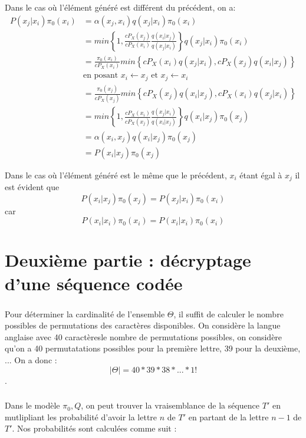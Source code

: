 \documentclass[11pt]{report}
\begin{document}
Dans le cas où l'élément généré est différent du précédent, on a:
\begin{align*}
P(x_j | x_i) \pi_0(x_i)
&= \alpha(x_j, x_i) q(x_j| x_i) \pi_0(x_i) \\
&= min \left\{1, \frac{cP_X(x_j)}{cP_X(x_i)} \frac{q(x_i|x_j)}{q(x_j|x_i)}\right\} q(x_j| x_i) \pi_0(x_i) \\
&= \frac{\pi_0(x_i)}{cP_X(x_i)} min \left\{cP_X(x_i) q(x_j|x_i), cP_X(x_j) q(x_i|x_j)\right\} \\
&\text{en posant } x_i \leftarrow x_j \text{ et } x_j \leftarrow x_i \\
&= \frac{\pi_0(x_j)}{cP_X(x_j)} min \left\{cP_X(x_j) q(x_i|x_j), cP_X(x_i) q(x_j|x_i)\right\} \\
&= min \left\{1, \frac{cP_X(x_i)}{cP_X(x_j)} \frac{q(x_j|x_i)}{q(x_i|x_j)}\right\} q(x_i| x_j) \pi_0(x_j)\\
&= \alpha(x_i, x_j) q(x_i| x_j) \pi_0(x_j) \\
&= P(x_i | x_j) \pi_0(x_j)
\end{align*} 

Dans le cas où l'élément généré est le même que le précédent, $x_i$ étant égal à $x_j$ il est évident que 
$$P(x_i | x_j) \pi_0(x_j) = P(x_j | x_i) \pi_0(x_i)$$
car 
$$P(x_i | x_i) \pi_0(x_i) = P(x_i | x_i) \pi_0(x_i)$$
\section{Deuxième partie : décryptage d’une séquence codée}
\subsubsection{}
Pour déterminer la cardinalité de l'ensemble $\Theta$, il suffit de calculer le nombre possibles de permutations des caractères disponibles. On considère la langue anglaise avec 40 caractèresle nombre de permutations possibles, on considère qu'on a 40 permutatations possibles pour la première lettre, 39 pour la deuxième, ... On a donc : 
$$|\Theta| = 40 * 39 *38 * ... * 1!$$. 
\subsubsection{}
\paragraph{}
Dans le modèle $\pi_0, Q$, on peut trouver la vraisemblance de la séquence $T'$ en mutlipliant les probabilité d'avoir la lettre $n$ de $T'$ en partant de la lettre $n-1$ de $T'$. Nos probabilités sont calculées comme suit : 
\end{document}
